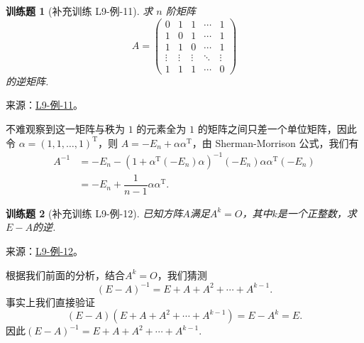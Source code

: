 \documentclass[12pt,fontset=fandol]{ctexart}
\newtheorem{exercise}{训练题}[section]
\begin{document}
\begin{exercise}[补充训练 L9-例-11]\label{prob:L9-例-11}
求 $n$ 阶矩阵 
\[A = \begin{pmatrix}
        0 & 1 & 1 & \cdots & 1 \\
        1 & 0 & 1 & \cdots & 1 \\
        1 & 1 & 0 & \cdots & 1 \\
        \vdots & \vdots & \vdots & \ddots & \vdots \\
        1 & 1 & 1 & \cdots & 0
    \end{pmatrix}\]
 的逆矩阵.
\end{exercise}
\noindent 来源：\href{https://github.com/yhwu-is/Linear-Algebra-Left-Undone/blob/new/%E8%AE%B2%E4%B9%89/%E4%B8%93%E9%A2%98/9%20%E7%9F%A9%E9%98%B5%E8%BF%90%E7%AE%97%E8%BF%9B%E9%98%B6.tex}{L9-例-11}。
\begin{solve}
不难观察到这一矩阵与秩为 $1$ 的元素全为 $1$ 的矩阵之间只差一个单位矩阵，因此令 $\alpha = (1,1,\ldots,1)^\mathrm{T}$，则 $A = -E_n + \alpha\alpha^\mathrm{T}$，由 Sherman-Morrison 公式，我们有
    \begin{align*}
        A^{-1} &= -E_n - (1 + \alpha^\mathrm{T}(-E_n)\alpha)^{-1}(-E_n)\alpha\alpha^\mathrm{T}(-E_n) \\
                &= -E_n + \dfrac{1}{n-1}\alpha\alpha^\mathrm{T}.
    \end{align*}
\end{solve}

\begin{exercise}[补充训练 L9-例-12]\label{prob:L9-例-12}
已知方阵$A$满足$A^k=O$，其中$k$是一个正整数，求$E-A$的逆.
\end{exercise}
\noindent 来源：\href{https://github.com/yhwu-is/Linear-Algebra-Left-Undone/blob/new/%E8%AE%B2%E4%B9%89/%E4%B8%93%E9%A2%98/9%20%E7%9F%A9%E9%98%B5%E8%BF%90%E7%AE%97%E8%BF%9B%E9%98%B6.tex}{L9-例-12}。
\begin{solve}
根据我们前面的分析，结合$A^k=O$，我们猜测
    \[(E-A)^{-1}=E+A+A^2+\cdots+A^{k-1}.\]
    事实上我们直接验证
    \[(E-A)(E+A+A^2+\cdots+A^{k-1})=E-A^k=E.\]
    因此$(E-A)^{-1}=E+A+A^2+\cdots+A^{k-1}$.
\end{solve}
\end{document}
